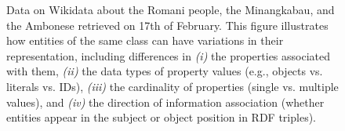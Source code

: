 




\begin{figure}[!htbp]
    \centering
    \caption{Data on Wikidata about the Romani people, the Minangkabau, and the Ambonese retrieved on 17th of February. This figure illustrates how entities of the same class can have variations in their representation, including differences in \textit{(i)} the properties associated with them, \textit{(ii)} the data types of property values (e.g., objects vs. literals vs. IDs), \textit{(iii)} the cardinality of properties (single vs. multiple values), and \textit{(iv)} the direction of information association (whether entities appear in the subject or object position in RDF triples).} \label{fig:intro-wikidata}
\end{figure}

